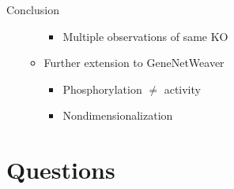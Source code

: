 \begin{frame}{Conclusion}
\begin{itemize}
\begin{itemize}
\begin{itemize}
            \item Multiple observations of same KO
        \end{itemize}
    \item Further extension to GeneNetWeaver
    \begin{itemize}
        \item Phosphorylation $\ne$ activity
        \item Nondimensionalization
    \end{itemize}
\end{itemize}
\end{itemize}
\end{frame}




\section*{Questions}

